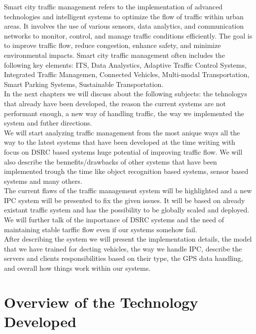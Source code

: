 \documentclass[17pt]{report}
\begin{document}
\indent \indent
Smart city traffic management refers to the implementation of advanced
technologies and intelligent systems to optimize the flow of traffic within
urban areas. It involves the use of various sensors, data analytics,
and communication networks to monitor, control, and manage traffic conditions
efficiently. The goal is to improve traffic flow, reduce congestion, enhance safety,
and minimize environmental impacts. Smart city traffic management often includes
the following key elements: ITS, Data Analystics, Adaptive Traffic Control Systems,
Integrated Traffic Managemen, Connected Vehicles, Multi-modal Transportation,
Smart Parking Systems, Sustainable Transportation.\\
\indent \indent
In the next chapters we will discuss about the following subjects: 
the tehnologys that already have been developed, the reason the 
current systems are not performant enough, a new way of handling 
traffic, the way we implemented the system and futher directions. \\
\indent \indent
We will start analyzing traffic management from the most anique ways all the
way to the latest systems that have been developed at the time writing with
focus on DSRC based systems huge potential of improving traffic flow. 
We will also describe the bennefits/drawbacks of other systems that have 
been implemented trough the time like object recognition based systems, 
sensor based systems and many others.\\
\indent \indent 
The current flaws of the traffic management system will be highlighted and 
a new IPC system will be presented to fix the given issues. It will be based on 
already existant traffic system and has the possibility to be globally scaled
and deployed. We will further talk of the importance of DSRC systems and the
need of maintaining stable tarffic flow even if our systems somehow fail. \\
\indent \indent 
After describing the system we will present the implementation details, the 
model that we have trained for decting vehicles, the way we handle IPC, describe 
the servers and clients responsibilities based on their type, the GPS data 
handling, and overall how things work within our systems.


\chapter{Overview of the Technology Developed}
\end{document}
